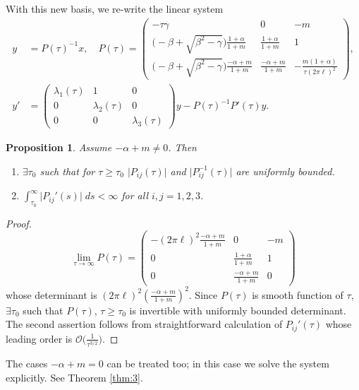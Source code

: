 \documentclass[a4paper,11pt]{article}
\def\l{(2\pi \ell)}
\newtheorem{proposition}{Proposition}[section]
\theoremstyle{remark}
\begin{document}
With this new basis, we re-write the linear system
\begin{equation}\label{eq:block1}
\begin{aligned}
 y &= P(\tau)^{-1} x, \quad P(\tau) = \begin{pmatrix} -\tau\gamma& 0 & -m\\ \Big(-\beta+\sqrt{\beta^2-\gamma}\Big)\frac{1+\alpha}{1+m} & \frac{1+\alpha}{1+m} & 1\\ \Big(-\beta+\sqrt{\beta^2-\gamma}\Big)\frac{-\alpha+m}{1+m} & \frac{-\alpha+m}{1+m} & -\frac{m(1+\alpha)}{\tau\l^2}\end{pmatrix}, \\
 y' &= \begin{pmatrix} \lambda_1(\tau) & 1 & 0\\0 & \lambda_2(\tau) & 0\\0 & 0 & \lambda_3(\tau)\end{pmatrix} y - P(\tau)^{-1}P'(\tau) y. 
\end{aligned}
\end{equation}
\begin{proposition} Assume $-\alpha+m \ne 0$. Then
 \begin{enumerate}
  \item $\exists \tau_0$ such that for $\tau\ge\tau_0$ $\big|P_{ij}(\tau)\big|$ and $\big|P^{-1}_{ij}(\tau)\big|$ are uniformly bounded.
  \item $\displaystyle \int_{\tau_0}^\infty \big|P_{ij}'(s)\big|\; ds < \infty$ for all $i,j=1,2,3$.
 \end{enumerate}
\end{proposition}
\begin{proof}
$$ \lim_{\tau \rightarrow \infty} P(\tau) = \begin{pmatrix} -\l^2\frac{-\alpha+m}{1+m}& 0 & -m\\ 0 & \frac{1+\alpha}{1+m} & 1\\ 0 & \frac{-\alpha+m}{1+m} & 0\end{pmatrix}$$
whose determinant is $\l^2 \left(\frac{-\alpha+m}{1+m}\right)^2$. Since $P(\tau)$ is smooth function of $\tau$, $\exists \tau_0$ such that $P(\tau)$, $\tau\ge\tau_0$ is invertible with uniformly bounded determinant. The second assertion follows from straightforward calculation of $P_{ij}'(\tau)$ whose leading order is $\mathcal{O}\big(\frac{1}{\tau^{3/2}}\big)$.
\end{proof}
The cases $-\alpha+m=0$ can be treated too; in this case we solve the system explicitly. See Theorem \ref{thm:3}.
\end{document}
